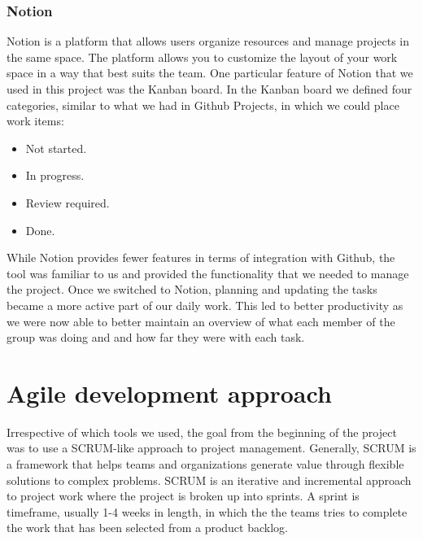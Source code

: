 \subsubsection{Notion}
Notion is a platform that allows users organize resources and manage projects in the same space. The platform allows you to customize the layout of your work space in a way that best suits the team. One particular feature of Notion that we used in this project was the Kanban board. In the Kanban board we defined four categories, similar to what we had in Github Projects, in which we could place work items:

\begin{itemize}
    \item Not started.
    \item In progress.
    \item Review required.
    \item Done.
\end{itemize}

While Notion provides fewer features in terms of integration with Github, the tool was familiar to us and provided the functionality that we needed to manage the project.
Once we switched to Notion, planning and updating the tasks became a more active part of our daily work. This led to better productivity as we were now able to better maintain an overview of what each member of the group was doing and and how far they were with each task.

\section{Agile development approach} \label{sec:agile-dev}
Irrespective of which tools we used, the goal from the beginning of the project was to use a SCRUM-like approach to project management. 
Generally, SCRUM is a framework that helps teams and organizations generate value through flexible solutions to complex problems. SCRUM is an iterative and incremental approach to project work where the project is broken up into sprints. A sprint is timeframe, usually 1-4 weeks in length, in which the the teams tries to complete the work that has been selected from a product backlog.

